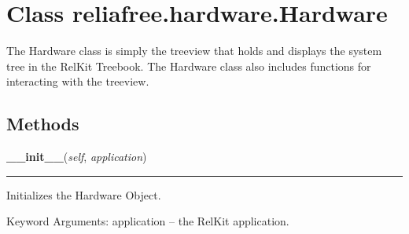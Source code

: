 %
%
%


\section{Class reliafree.hardware.Hardware}

    \label{reliafree:hardware:Hardware}
The Hardware class is simply the treeview that holds and displays the 
system tree in the RelKit Treebook.  The Hardware class also includes 
functions for interacting with the treeview.



  \subsection{Methods}

    \label{reliafree:hardware:Hardware:__init__}

    \vspace{0.5ex}

\hspace{.8\funcindent}\begin{boxedminipage}{\funcwidth}

    \raggedright \textbf{\_\_init\_\_}(\textit{self}, \textit{application})

    \vspace{-1.5ex}

    \rule{\textwidth}{0.5\fboxrule}
\setlength{\parskip}{2ex}
    Initializes the Hardware Object.

    Keyword Arguments: application -- the RelKit application.

\setlength{\parskip}{1ex}
    \end{boxedminipage}

